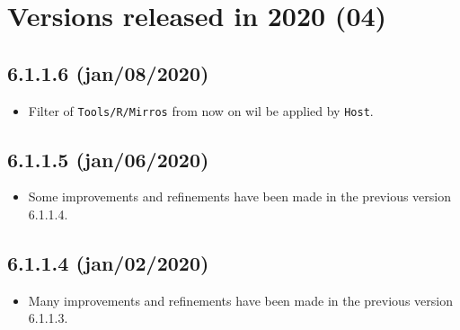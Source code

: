 
\hypertarget{2020}{}
\section{Versions released in 2020 (04)}

\subsection*{6.1.1.6 (jan/08/2020)}
\begin{itemize}
  \item Filter of \texttt{Tools/R/Mirros} from now on wil be applied by \texttt{Host}.
\end{itemize}

\subsection*{6.1.1.5 (jan/06/2020)}
\begin{itemize}
  \item Some improvements and refinements have been made in the previous version 6.1.1.4.
\end{itemize}

\subsection*{6.1.1.4 (jan/02/2020)}
\begin{itemize}
  \item Many improvements and refinements have been made in the previous version 6.1.1.3.
\end{itemize}

